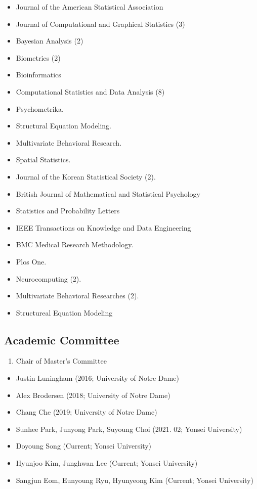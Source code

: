 \documentclass[
]{book}
\providecommand{\tightlist}{%
  \setlength{\itemsep}{0pt}\setlength{\parskip}{0pt}}
\begin{document}
\begin{itemize}
\tightlist
\item
  Journal of the American Statistical Association
\item
  Journal of Computational and Graphical Statistics (3)
\item
  Bayesian Analysis (2)
\item
  Biometrics (2)
\item
  Bioinformatics
\item
  Computational Statistics and Data Analysis (8)
\item
  Psychometrika.
\item
  Structural Equation Modeling.
\item
  Multivariate Behavioral Research.
\item
  Spatial Statistics.
\item
  Journal of the Korean Statistical Society (2).
\item
  British Journal of Mathematical and Statistical Psychology
\item
  Statistics and Probability Letters
\item
  IEEE Transactions on Knowledge and Data Engineering
\item
  BMC Medical Research Methodology.
\item
  Plos One.
\item
  Neurocomputing (2).
\item
  Multivariate Behavioral Researches (2).
\item
  Structureal Equation Modeling
\end{itemize}

\hypertarget{academic-committee}{%
\subsection*{Academic Committee}\label{academic-committee}}

\begin{enumerate}
\def\labelenumi{\arabic{enumi}.}
\tightlist
\item
  Chair of Master's Committee
\end{enumerate}

\begin{itemize}
\tightlist
\item
  Justin Luningham (2016; University of Notre Dame)
\item
  Alex Brodersen (2018; University of Notre Dame)
\item
  Chang Che (2019; University of Notre Dame)
\item
  Sunhee Park, Junyong Park, Suyoung Choi (2021. 02; Yonsei University)
\item
  Doyoung Song (Current; Yonsei University)
\item
  Hyunjoo Kim, Junghwan Lee (Current; Yonsei University)
\item
  Sangjun Eom, Eunyoung Ryu, Hyunyeong Kim (Current; Yonsei University)
\end{itemize}
\end{document}
